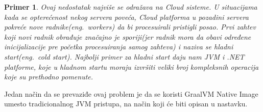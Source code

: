 \documentclass[a4paper]{article}
\newtheorem{primer}{Primer}[section]
\begin{document}
\begin{primer}
Ovaj nedostatak najviše se odražava na Cloud sisteme. U situacijama kada se opterećenost nekog servera poveća, Cloud platforma u pozadini servera pokreće nove radnike(eng.~{\em workers}) da bi procesuirali pristigli posao. Prvi zahtev koji novi radnik obrađuje značajno je sporiji(jer radnik mora da obavi određene inicijalizacije pre početka procesuiranja samog zahteva) i naziva se hladni start(eng.~{\em cold start}). Najbolji primer za hladni start daju nam JVM i .NET platforme, koje u hladnom startu moraju izvršiti veliki broj kompleksnih operacija koje su prethodno pomenute. 
 \end{primer}
 
Jedan način da se prevaziđe ovaj problem je da se koristi GraalVM Native Image umesto tradicionalnog JVM pristupa, na način koji će biti opisan u nastavku.
\end{document}
